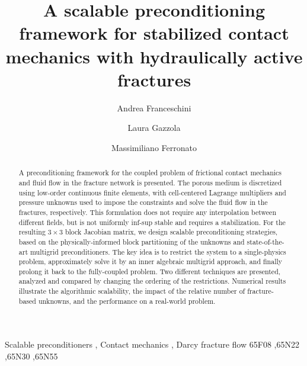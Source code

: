 \documentclass[3p,times]{elsarticle}
\theoremstyle{plain}
\begin{document}
\begin{frontmatter}

\title{A scalable preconditioning framework for stabilized contact mechanics with
       hydraulically active fractures}

\author[UNIPD]{Andrea Franceschini}

\author[UNIPD]{Laura Gazzola}

\author[UNIPD]{Massimiliano Ferronato}

\address[UNIPD]{Department of Civil, Environmental and Architectural Engineering,
  University of Padova, Padova, Italy}

\begin{abstract}
A preconditioning framework for the coupled problem of frictional contact
mechanics and fluid flow in the fracture network is presented. The porous medium is
discretized using low-order continuous finite elements, with cell-centered Lagrange
multipliers and pressure unknowns used to impose the constraints and solve the fluid flow in the fractures, respectively. This formulation does not require any interpolation between
different fields, but is not uniformly inf-sup stable and requires a stabilization. For
the resulting $3 \times 3$ block Jacobian matrix, we design scalable preconditioning
strategies, based on the physically-informed block partitioning of the unknowns and
state-of-the-art multigrid preconditioners. The key idea is to restrict the system to a single-physics problem, approximately solve it by an inner algebraic multigrid approach, and finally prolong it back to the fully-coupled problem. Two different techniques are presented, analyzed and compared by changing the ordering of the
restrictions. Numerical results
illustrate the algorithmic scalability, the impact of the relative number of
fracture-based unknowns, and the performance on a real-world problem.

\end{abstract}

\begin{keyword}
Scalable preconditioners \sep
Contact mechanics \sep
Darcy fracture flow
\MSC[2010] 65F08 \sep 65N22 \sep 65N30 \sep 65N55
\end{keyword}

\end{frontmatter}
\end{document}
